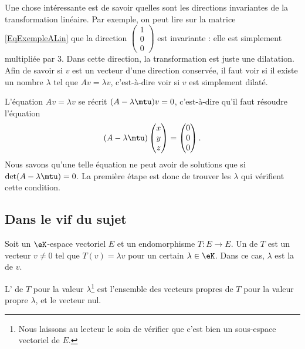 Une chose intéressante est de savoir quelles sont les directions invariantes de la transformation linéaire. Par exemple, on peut lire sur la matrice \eqref{EqExempleALin} que la direction \( \begin{pmatrix}
	1 \\
	0 \\
	0
\end{pmatrix}\) est invariante : elle est simplement multipliée par \( 3\). Dans cette direction, la transformation est juste une dilatation. Afin de savoir si \( v\) est un vecteur d'une direction conservée, il faut voir si il existe un nombre \( \lambda\) tel que \( Av=\lambda v\), c'est-à-dire voir si \( v\) est simplement dilaté.

L'équation \( Av=\lambda v\) se récrit \( (A-\lambda\mtu)v=0\), c'est-à-dire qu'il faut résoudre l'équation
\begin{equation}
	(A-\lambda\mtu)\begin{pmatrix}
		x \\
		y \\
		z
	\end{pmatrix}=
	\begin{pmatrix}
		0 \\
		0 \\
		0
	\end{pmatrix}.
\end{equation}
Nous savons qu'une telle équation ne peut avoir de solutions que si \( \det(A-\lambda\mtu)=0\). La première étape est donc de trouver les \( \lambda\) qui vérifient cette condition.

\subsection{Dans le vif du sujet}

\begin{definition}      \label{DefooMMKZooVcskCc}
	Soit un \( \eK\)-espace vectoriel \( E\) et un endomorphisme \( T\colon E\to E\). Un  de \( T\) est un vecteur \( v \neq 0\) tel que \( T(v)=\lambda v\) pour un certain \( \lambda\in \eK\). Dans ce cas, \( \lambda\) est la  de \( v\).

	L' de \( T\) pour la valeur \( \lambda\)\footnote{Nous laissons au lecteur le soin de vérifier que c'est bien un sous-espace vectoriel de \( E\).} est l'ensemble des vecteurs propres de \( T\) pour la valeur propre \( \lambda\), et le vecteur nul.
\end{definition}

